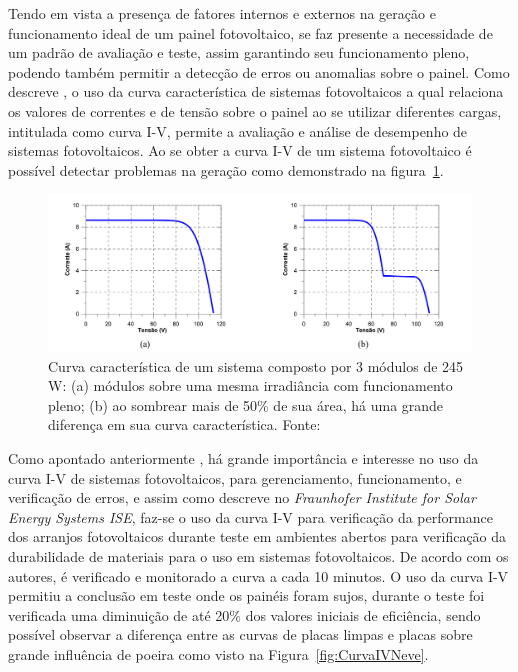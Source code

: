 Tendo em vista a presença de fatores internos e externos na geração e funcionamento ideal de um painel fotovoltaico, se faz presente a necessidade de um padrão de avaliação e teste, assim garantindo seu funcionamento pleno, podendo também permitir a detecção de erros ou anomalias sobre o painel. Como descreve , o uso da curva característica de sistemas fotovoltaicos a qual relaciona os valores de correntes e de tensão sobre o painel ao se utilizar diferentes cargas, intitulada como curva I-V, permite a avaliação e análise de desempenho de sistemas fotovoltaicos. Ao se obter a curva I-V de um sistema fotovoltaico é possível detectar problemas na geração como demonstrado na figura~\ref{fig:CurvaIV}.

\FloatBarrier
\begin{figure}[htbp]
	\centering
	\includegraphics[scale=0.4]{imagens/CurvaIV}
	\caption{Curva característica de um sistema composto por 3 módulos de 245 W: (a) módulos sobre uma mesma irradiância com funcionamento pleno; (b) ao sombrear mais de 50\% de sua área, há uma grande diferença em sua curva característica. Fonte:   }
	
	\label{fig:CurvaIV}
\end{figure}
\FloatBarrier


Como apontado anteriormente , há grande importância e interesse no uso da curva I-V de sistemas fotovoltaicos, para gerenciamento, funcionamento, e verificação de erros, e assim como descreve  no \textit{Fraunhofer Institute for Solar Energy Systems ISE}, faz-se o uso da curva I-V para verificação da performance dos arranjos fotovoltaicos durante teste em ambientes abertos para verificação da durabilidade de materiais para o uso em sistemas fotovoltaicos. De acordo com os autores, é verificado e monitorado a curva a cada 10 minutos. O uso da curva I-V permitiu a conclusão em teste onde os painéis foram sujos, durante o teste foi verificada uma diminuição de até 20\% dos valores iniciais de eficiência, sendo possível observar a diferença entre as curvas de placas limpas e placas sobre grande influência de poeira como visto na Figura~\ref{fig:CurvaIVNeve}.

